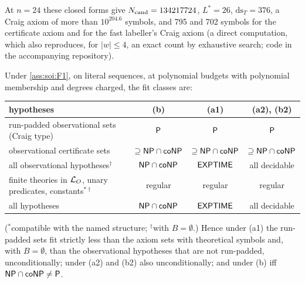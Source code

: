 At $n=24$ these closed forms give $N_{\rm cand}=134217724$, $L^*=26$, $\mathrm{ds}_T=376$, a Craig axiom of more than $10^{204.6}$ symbols, and 795 and 702 symbols for the certificate axiom and for the fast labeller's Craig axiom (a direct computation, which also reproduces, for $\lvert w\rvert\le4$, an exact count by exhaustive search; code in the accompanying repository).

\begin{corollary}\label{cor:terms:table}
Under \cref{ass:soi:F1}, on literal sequences, at polynomial budgets with polynomial membership and degrees charged, the fit classes are:
\begin{center}\small
\begin{tabular}{@{}lccc@{}}
\toprule
hypotheses & (b) & (a1) & (a2), (b2)\\
\midrule
run-padded observational sets (Craig type) & $\mathsf{P}$ & $\mathsf{P}$ & $\mathsf{P}$\\
observational certificate sets & $\supseteq\mathsf{NP}\cap\mathsf{coNP}$ & $\supseteq\mathsf{NP}\cap\mathsf{coNP}$ & $\supseteq\mathsf{NP}\cap\mathsf{coNP}$\\
all observational hypotheses$^\dagger$ & $\mathsf{NP}\cap\mathsf{coNP}$ & $\mathsf{EXPTIME}$ & all decidable\\
finite theories in $\mathcal{L}_{O}$, unary predicates, constants$^{*\dagger}$ & regular & regular & regular\\
all hypotheses & $\mathsf{NP}\cap\mathsf{coNP}$ & $\mathsf{EXPTIME}$ & all decidable\\
\bottomrule
\end{tabular}
\end{center}
($^*$compatible with the named structure; $^\dagger$with $B=\emptyset$.) Hence under (a1) the run-padded sets fit strictly less than the axiom sets with theoretical symbols and, with $B=\emptyset$, than the observational hypotheses that are not run-padded, unconditionally; under (a2) and (b2) also unconditionally; and under (b) iff $\mathsf{NP}\cap\mathsf{coNP}\ne\mathsf{P}$.
\end{corollary}

